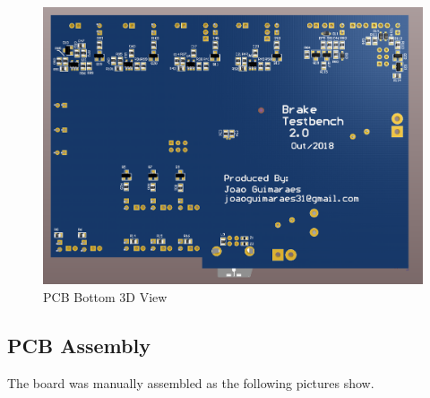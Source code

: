 		\begin{figure}[htbp]
			\centering
			\includegraphics[scale=0.8]{figuras/fig-pcb-print-bottom}
			\caption{PCB Bottom 3D View}
			\label{fig:pcb-print-bottom}
		\end{figure}

	\subsection{PCB Assembly}\label{ssec:pcb-assembly}

		The board was manually assembled as the following pictures show.